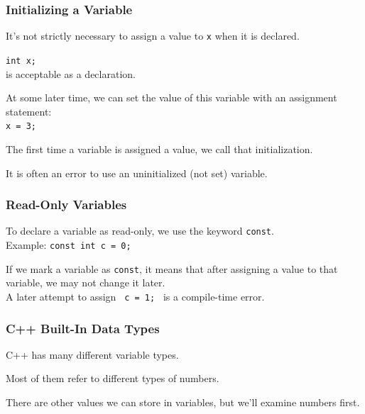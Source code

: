 \begin{frame}
\frametitle{Initializing a Variable}
It's not strictly necessary to assign a value to \texttt{x} when it is declared.

\texttt{int x;}\\
\quad is acceptable as a declaration.

At some later time, we can set the value of this variable with an assignment statement:\\
\quad \texttt{x = 3;}

The first time a variable is assigned a value, we call that \alert{initialization}.

It is often an error to use an uninitialized (not set) variable.

\end{frame}

\begin{frame}
\frametitle{Read-Only Variables}
To declare a variable as read-only, we use the keyword \alert{\texttt{const}}.\\
\quad Example: \texttt{const int c = 0;}

If we mark a variable as \texttt{const}, it means that after assigning a value to that variable, we may not change it later.\\
\quad A later attempt to assign \texttt{ c = 1; } is a compile-time error.

\end{frame}

\begin{frame}
\frametitle{C++ Built-In Data Types}

C++ has many different variable types.

Most of them refer to different types of numbers.

There are other values we can store in variables, but we'll examine numbers first.


\end{frame}

